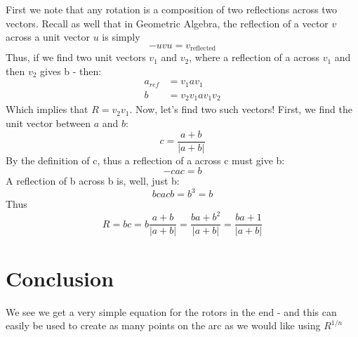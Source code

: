 \documentclass{article}
\begin{document}
First we note that any rotation is a composition of two reflections across two vectors. Recall as well that in Geometric Algebra, the reflection of a vector $v$ across a unit vector $u$ is simply \begin{equation}
    -uvu = v_{\text{reflected}}
\end{equation}
Thus, if we find two unit vectors $v_1$ and $v_2$, where a reflection of a across $v_1$ and then $v_2$ gives b - then:
\begin{align*}
    a_{ref} &= v_1av_1 \\
    b &= v_2v_1av_1v_2
\end{align*}
Which implies that $R = v_2v_1$. Now, let's find two such vectors! First, we find the unit vector between $a$ and $b$:
\begin{equation}
    c = \frac{a+b}{|a+b|}
\end{equation}
By the definition of c, thus a reflection of a across c must give  b:
\begin{equation}
    -cac = b
\end{equation}
A reflection of b across b is, well, just b:
\begin{equation}
    bcacb = b^3 = b
\end{equation}
Thus
\begin{equation}
    R = bc = b\frac{a + b}{|a + b|} = \frac{ba + b^2}{|a + b|} = \frac{ba + 1}{|a + b|}
\end{equation}
\section{Conclusion}
We see we get a very simple equation for the rotors in the end - and this can easily be used to create as many points on the arc as we would like using $R^{1/n}$
\end{document}
